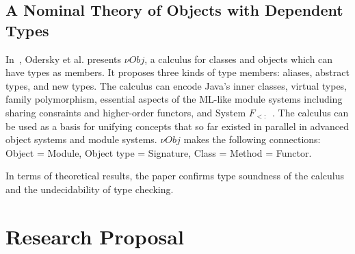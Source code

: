 \documentclass[10pt,journal,a4paper]{IEEEtran}
\begin{document}
\subsection{A Nominal Theory of Objects with Dependent Types}

In~\cite{nuObj}, Odersky et al. presents ${\nu}Obj$, a calculus for
classes and objects which can have types as members. It proposes three
kinds of type members: aliases, abstract types, and new types. The
calculus can encode Java's inner classes, virtual types, family
polymorphism, essential aspects of the ML-like module systems
including sharing consraints and higher-order functors, and System
$F_{<:}$~\cite{tapl}. The calculus can be used as a basis for unifying
concepts that so far existed in parallel in advanced object systems
and module systems. ${\nu}Obj$ makes the following connections: Object =
Module, Object type = Signature, Class = Method = Functor.

In terms of theoretical results, the paper confirms type soundness of
the calculus and the undecidability of type checking.

\section{Research Proposal} %


%
\end{document}

